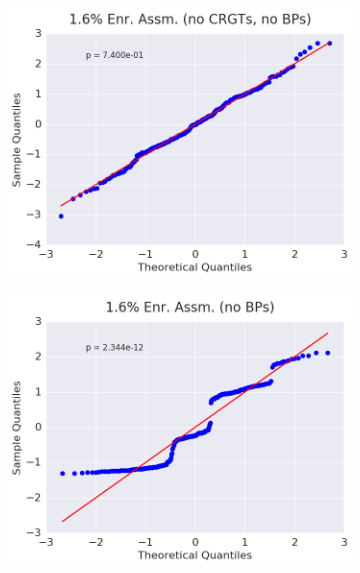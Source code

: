 \begin{figure}[h!]
\centering
\begin{subfigure}{0.5\textwidth}
  \centering
  \includegraphics[width=\linewidth]{figures/patterns/assm-1.6-inf/quantile/assm-16-inf-capt-1}
  \caption{}
  \label{fig:chap9-qq-assm-1.6-inf-capt}
\end{subfigure}%
\begin{subfigure}{0.5\textwidth}
  \centering
  \includegraphics[width=\linewidth]{figures/patterns/assm-1.6/quantile/assm-16-capt-1}
  \caption{}
  \label{fig:chap9-qq-assm-1.6-capt}
\end{subfigure}
\begin{subfigure}{0.5\textwidth}

\end{subfigure}
\end{figure}
